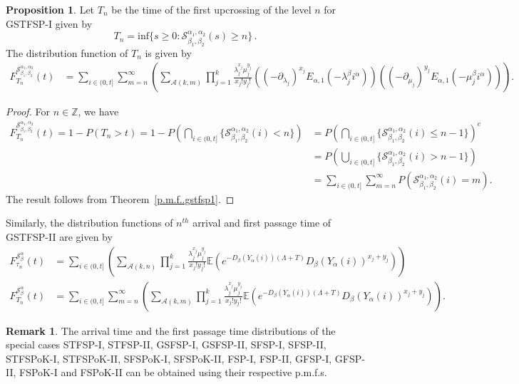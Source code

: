 \documentclass[11pt,oneside,reqno]{amsart}
\theoremstyle{definition}
\newtheorem{remark}{\bf Remark}[section]
\newtheorem{proposition}{Proposition}[section]
\theoremstyle{remarkstyle}
\begin{document}
\begin{proposition}\label{first passage.ngsp}
    Let $T_n$ be the time of the first upcrossing of the level $n$ for GSTFSP-I given by
\begin{equation*}
    T_n=\text{inf}\{s\geq 0:\mathcal{S}_{\beta_1,\beta_2}^{\alpha_1,\alpha_2}(s)\geq n\}\,.
\end{equation*}
The distribution function of $T_n$ is given by 
\begin{align*}
    F^{\mathcal{S}_{\beta_1,\beta_2}^{\alpha_1,\alpha_2}}_{T_n}(t)&=\sum_{i\in (0,t]}\sum_{m=n}^{\infty}(\sum_{\mathcal{A}(k,m)}\prod_{j=1}^{k}\frac{\lambda_j^{x_j}\mu_j^{y_j}}{x_j!y_j!}((-\partial_{\lambda_j})^{x_j}E_{\alpha,1}(-\lambda_j^\beta i^\alpha))((-\partial_{\mu_j})^{y_j}E_{\alpha,1}(-\mu_j^\beta i^\alpha))).
\end{align*}
\end{proposition}

\begin{proof} For $n\in \mathbb{Z}$, we have
    \begin{align*}
    F^{\mathcal{S}_{\beta_1,\beta_2}^{\alpha_1,\alpha_2}}_{T_n}(t)=1-P(T_n> t)=1-P(\bigcap_{i\in (0,t]}\{\mathcal{S}_{\beta_1,\beta_2}^{\alpha_1,\alpha_2}(i)<n\})
    &=P(\bigcap_{i\in (0,t]}\{\mathcal{S}_{\beta_1,\beta_2}^{\alpha_1,\alpha_2}(i)\le n-1\})^c\\
    &=P(\bigcup_{i\in (0,t]}\{\mathcal{S}_{\beta_1,\beta_2}^{\alpha_1,\alpha_2}(i) > n-1\})\\
    &= \sum_{i\in (0,t]}\sum_{m=n}^{\infty}P(\mathcal{S}_{\beta_1,\beta_2}^{\alpha_1,\alpha_2}(i)= m).
\end{align*}
The result follows from Theorem~\ref{p.m.f..gstfsp1}.
\end{proof}
 Similarly, the distribution functions of $n^{th}$ arrival and first passage time of GSTFSP-II are given by
 \begin{align*}
        F^{\mathcal{S}_{\beta}^{\alpha}}_{\tau_n}(t)&=\sum_{i\in(0,t]}(\sum_{\mathcal{A}(k,n)}\prod_{j=1}^{k}\frac{\lambda_j^{x_j}\mu_j^{y_j}}{x_j!y_j!}\mathbb{E}(e^{-D_\beta(Y_\alpha(i))(\Lambda+T)}D_\beta(Y_\alpha(i))^{x_j+y_j}))\\
         F^{\mathcal{S}_{\beta}^{\alpha}}_{T_n}(t)&=\sum_{i\in (0,t]}\sum_{m=n}^{\infty}(\sum_{\mathcal{A}(k,m)}\prod_{j=1}^{k}\frac{\lambda_j^{x_j}\mu_j^{y_j}}{x_j!y_j!}\mathbb{E}(e^{-D_\beta(Y_\alpha(i))(\Lambda+T)}D_\beta(Y_\alpha(i))^{x_j+y_j})).
 \end{align*}
\begin{remark}
    The arrival time and the first passage time distributions of the special cases STFSP-I, STFSP-II, GSFSP-I, GSFSP-II, SFSP-I, SFSP-II, STFSPoK-I, STFSPoK-II, SFSPoK-I, SFSPoK-II, FSP-I, FSP-II, GFSP-I, GFSP-II, FSPoK-I and FSPoK-II can be obtained using their respective p.m.f.s.
\end{remark}
\end{document}
